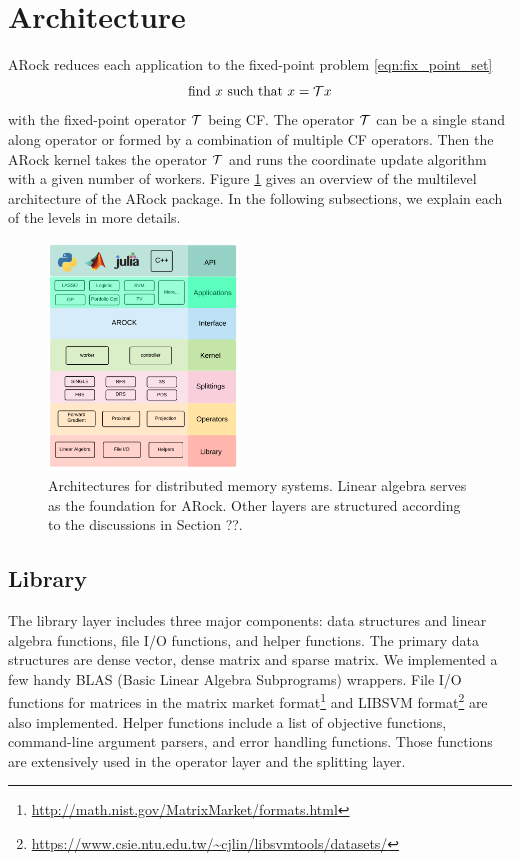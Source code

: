 \section{Architecture}

ARock reduces each application to the fixed-point problem \eqref{eqn:fix_point_set} 
\begin{equation}\label{eqn:fix_point_set}
\text{find } x \text{ such that } x = {\mathcal{T}} x
\end{equation}
with the fixed-point operator ${\mathcal{T}}$ being CF. The operator ${\mathcal{T}}$ can be a single stand along operator or formed by a combination of multiple CF operators. Then the ARock kernel takes the operator ${\mathcal{T}}$ and runs the coordinate update algorithm with a given number of workers. Figure \ref{fig:arch} gives an overview of the multilevel architecture of the ARock package. In the following subsections, we explain each of the levels in more details. 
\begin{figure}[!h]
      \centering
        \includegraphics[width=0.45\textwidth]{./figs/architecture.png}
      \caption{Architectures for distributed memory systems. Linear algebra serves as the foundation for ARock. Other layers are structured according to the discussions in Section ??.}
        \label{fig:arch}
\end{figure}


\subsection{Library}
The library layer includes three major components: data structures and linear algebra functions, file I/O functions, and helper functions. The primary data structures are dense vector, dense matrix and sparse matrix. We implemented a few handy BLAS (Basic Linear Algebra Subprograms) wrappers. File I/O functions for matrices in the matrix market format\footnote{\url{http://math.nist.gov/MatrixMarket/formats.html}} and LIBSVM format\footnote{\url{https://www.csie.ntu.edu.tw/~cjlin/libsvmtools/datasets/}} are also implemented. Helper functions include a list of objective functions, command-line argument parsers, and error handling functions. Those functions are extensively used in the operator layer and the splitting layer. 

